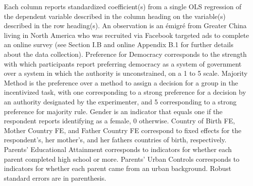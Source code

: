 \begin{adjustwidth}{-1cm}{-1cm}            
    \begin{scriptsize}        
    Each column reports standardized coefficient(s) from a single OLS regression of the dependent variable described in the column heading on the variable(s) described in the row heading(s). An observation is an émigré from Greater China living in North America who was recruited via Facebook targeted ads to complete an online survey (see Section I.B and online Appendix B.1 for further details about the data collection). Preference for Democracy corresponds to the strength with which participants report preferring democracy as a system of government over a system in which the authority is unconstrained, on a 1 to 5 scale. Majority Method is the preference over a method to assign a decision for a group in the incentivized task, with one corresponding to a strong preference for a decision by an authority designated by the experimenter, and 5 corresponding to a strong preference for majority rule. Gender is an indicator that equals one if the respondent reports identifying as a female, 0 otherwise. Country of Birth FE, Mother Country FE, and Father Country FE correspond to fixed effects for the respondent's, her mother's, and her fathers countries of birth, respectively. Parents' Educational Attainment corresponds to indicators for whether each parent completed high school or more. Parents' Urban Controls corresponds to indicators for whether each parent came from an urban background. Robust standard errors are in parenthesis.        \end{scriptsize} 
\end{adjustwidth}

